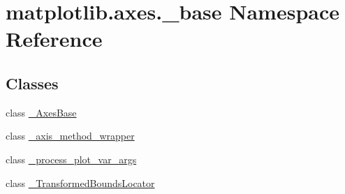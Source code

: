 \hypertarget{namespacematplotlib_1_1axes_1_1__base}{}\section{matplotlib.\+axes.\+\_\+base Namespace Reference}
\label{namespacematplotlib_1_1axes_1_1__base}
\subsection*{Classes}
\begin{DoxyCompactItemize}
\item 
class \hyperlink{classmatplotlib_1_1axes_1_1__base_1_1__AxesBase}{\+\_\+\+Axes\+Base}
\item 
class \hyperlink{classmatplotlib_1_1axes_1_1__base_1_1__axis__method__wrapper}{\+\_\+axis\+\_\+method\+\_\+wrapper}
\item 
class \hyperlink{classmatplotlib_1_1axes_1_1__base_1_1__process__plot__var__args}{\+\_\+process\+\_\+plot\+\_\+var\+\_\+args}
\item 
class \hyperlink{classmatplotlib_1_1axes_1_1__base_1_1__TransformedBoundsLocator}{\+\_\+\+Transformed\+Bounds\+Locator}
\end{DoxyCompactItemize}
